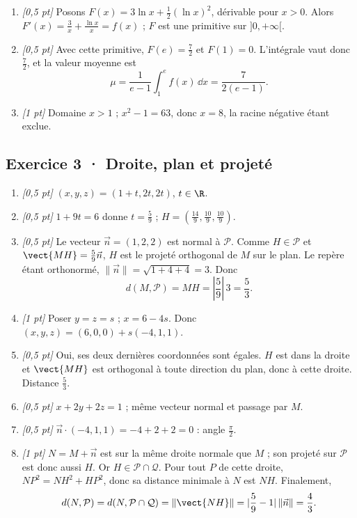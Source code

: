 \begin{enumerate}
\item \textit{[0,5 pt]} Posons $F(x)=3\ln x+\frac12(\ln x)^2$, dérivable pour $x>0$. Alors $F'(x)=\frac{3}{x}+\frac{\ln x}{x}=f(x)$ ; $F$ est une primitive sur $]0,+\infty[$.

\item \textit{[0,5 pt]} Avec cette primitive, $F(e)=\frac{7}{2}$ et $F(1)=0$. L'intégrale vaut donc $\frac{7}{2}$, et la valeur moyenne est
\[\mu=\frac{1}{e-1}\int_1^e f(x)\,\dd x=\frac{7}{2(e-1)}.\]

\item \textit{[1 pt]} Domaine $x>1$ ; $x^2-1=63$, donc $x=8$, la racine négative étant exclue.

\end{enumerate}

\subsection*{Exercice 3 · Droite, plan et projeté}\begin{enumerate}

\item \textit{[0,5 pt]} $(x,y,z)=(1+t,2t,2t)$, $t\in\R$.

\item \textit{[0,5 pt]} $1+9t=6$ donne $t=\frac{5}{9}$ ; $H=(\frac{14}{9},\frac{10}{9},\frac{10}{9})$.

\item \textit{[0,5 pt]} Le vecteur $\vec n=(1,2,2)$ est normal à $\mathcal P$. Comme $H\in\mathcal P$ et $\vect{MH}=\frac{5}{9}\vec n$, $H$ est le projeté orthogonal de $M$ sur le plan. Le repère étant orthonormé, $\|\vec n\|=\sqrt{1+4+4}=3$. Donc
\[d(M,\mathcal P)=MH=|\frac{5}{9}|\,3=\frac{5}{3}.\]

\item \textit{[1 pt]} Poser $y=z=s$ ; $x=6-4s$. Donc $(x,y,z)=(6,0,0)+s(-4,1,1)$.

\item \textit{[0,5 pt]} Oui, ses deux dernières coordonnées sont égales. $H$ est dans la droite et $\vect{MH}$ est orthogonal à toute direction du plan, donc à cette droite. Distance $\frac{5}{3}$.

\item \textit{[0,5 pt]} $x+2y+2z=1$ ; même vecteur normal et passage par $M$.

\item \textit{[0,5 pt]} $\vec n\cdot(-4,1,1)=-4+2+2=0$ : angle $\frac{\pi}{2}$.

\item \textit{[1 pt]} $N=M+\vec n$ est sur la même droite normale que $M$ ; son projeté sur $\mathcal P$ est donc aussi $H$. Or $H\in\mathcal P\cap\mathcal Q$. Pour tout $P$ de cette droite, $NP^2=NH^2+HP^2$, donc sa distance minimale à $N$ est $NH$. Finalement,
\[d(N,\mathcal P)=d(N,\mathcal P\cap\mathcal Q)=\|\vect{NH}\|=|\frac{5}{9}-1|\,\|\vec n\|=\frac{4}{3}.\]

\end{enumerate}

